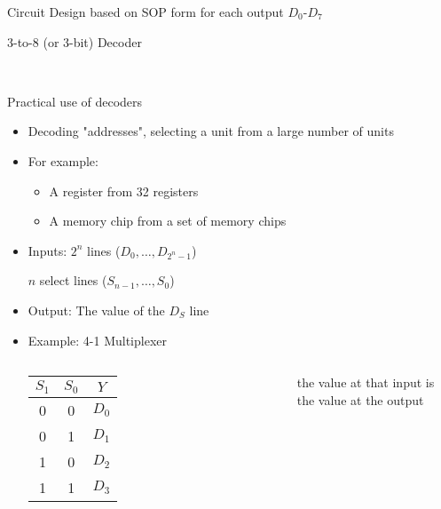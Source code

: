 \begin{frame}{Circuit Design based on SOP form for each output $D_0$-$D_7$}
		\centerline{3-to-8 (or 3-bit) Decoder}
\BNotes\ifnum{}
~
\fi\ENotes
\end{frame}

\begin{frame}{Practical use of decoders}
    \begin{tcolorbox}[enhanced,attach boxed title to top center={yshift=-3mm,yshifttext=-1mm},
  colback=blue!5!white,colframe=blue!75!black,colbacktitle=blue!80!black,
  title=Think About It,fonttitle=\bfseries,
  boxed title style={size=small,colframe=red!50!black} ]
  \begin{itemize}
    \item Decoding "addresses", selecting a unit from a large number of units
    \item For example: 
    \begin{itemize}
            \item A register from 32 registers
    \item A memory chip from a set of memory chips
    \end{itemize}
  \end{itemize}
\end{tcolorbox}
\end{frame}


\begin{frame}[fragile]
\begin{itemize}
	\item Inputs: $2^n$ lines ($D_0,\dots,D_{2^n-1}$)

		$n$ select lines ($S_{n-1},\dots,S_0$)
	\item Output: The value of the $D_S$ line
	\item Example: 4-1 Multiplexer
		\begin{center}
  \begin{columns}

  
		\begin{tabular}{cc|c}
		$S_1$ & $S_0$ & $Y$\\\hline
		0 & 0 & $D_0$\\
		0 & 1 & $D_1$\\
		1 & 0 & $D_2$\\
		1 & 1 & $D_3$\\
		\end{tabular}
        {\footnotesize \color{red} the value at that input is the value at the output}
  \end{columns}
		\end{center}

\end{itemize}
\end{frame}

